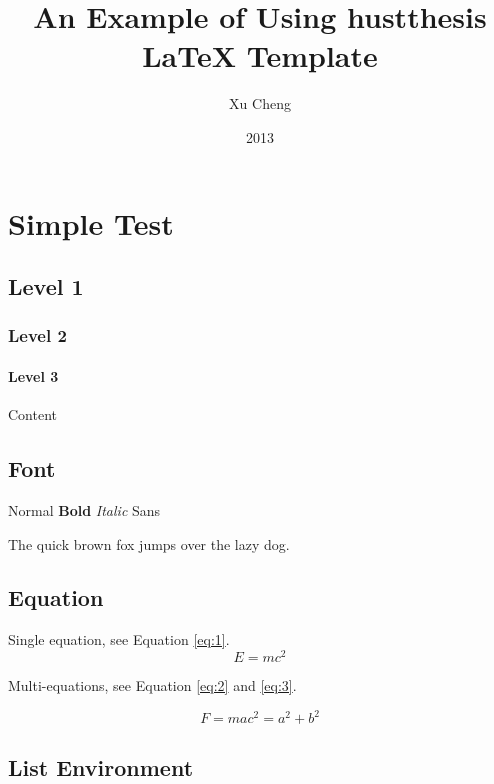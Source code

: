 \documentclass[degree=bachelor]{hustthesis-en}
\title{An Example of Using hustthesis \LaTeX{} Template}
\author{Xu Cheng}
\date{2013}{6}{1}
\begin{document}
\frontmatter
\maketitle
\makeabstract
\tableofcontents
\mainmatter

\chapter{Simple Test}

\section{Level 1}
\subsection{Level 2}
\subsubsection{Level 3}
Content

\section{Font}

Normal \textbf{Bold} \emph{Italic} \textsf{Sans}

The quick brown fox jumps over the lazy dog.

\section{Equation}

Single equation, see Equation \ref{eq:1}.
\begin{equation}
  E = mc^2 \label{eq:1}
\end{equation}

Multi-equations, see Equation \ref{eq:2} and \ref{eq:3}.

\begin{subequations}
\begin{equation}
  F = ma \label{eq:2}
\end{equation}
\begin{equation}
  c^2 = a^2 + b^2 \label{eq:3}
\end{equation}
\end{subequations}

\section{List Environment}
\end{document}
